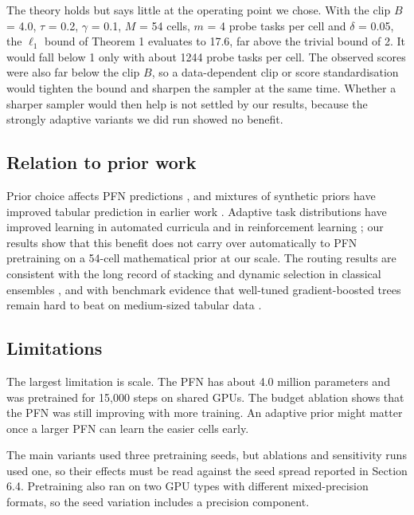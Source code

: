 \documentclass[mathematics,article,submit,pdftex,moreauthors]{Definitions/mdpi}
\begin{document}
The theory holds but says little at the operating point we chose. With the clip $B$ = 4.0, $\tau$ = 0.2, $\gamma$ = 0.1, $M$ = 54 cells, $m$ = 4 probe tasks per cell and $\delta$ = 0.05, the $\ell_1$ bound of Theorem 1 evaluates to 17.6, far above the trivial bound of 2. It would fall below 1 only with about 1244 probe tasks per cell. The observed scores were also far below the clip $B$, so a data-dependent clip or score standardisation would tighten the bound and sharpen the sampler at the same time. Whether a sharper sampler would then help is not settled by our results, because the strongly adaptive variants we did run showed no benefit.

\subsection{Relation to prior work}

Prior choice affects PFN predictions \cite{nagler2023statistical}, and mixtures of synthetic priors have improved tabular prediction in earlier work \cite{zhang2025mitra}. Adaptive task distributions have improved learning in automated curricula and in reinforcement learning \cite{graves2017automated,jiang2021prioritized,parkerholder2022evolving}; our results show that this benefit does not carry over automatically to PFN pretraining on a 54-cell mathematical prior at our scale. The routing results are consistent with the long record of stacking and dynamic selection in classical ensembles \cite{wolpert1992stacked,breiman1996stacked,cruz2018dynamic}, and with benchmark evidence that well-tuned gradient-boosted trees remain hard to beat on medium-sized tabular data \cite{grinsztajn2022why,mcelfresh2023when}.

\subsection{Limitations}

The largest limitation is scale. The PFN has about 4.0 million parameters and was pretrained for 15,000 steps on shared GPUs. The budget ablation shows that the PFN was still improving with more training. An adaptive prior might matter once a larger PFN can learn the easier cells early.

The main variants used three pretraining seeds, but ablations and sensitivity runs used one, so their effects must be read against the seed spread reported in Section 6.4. Pretraining also ran on two GPU types with different mixed-precision formats, so the seed variation includes a precision component.
\end{document}
